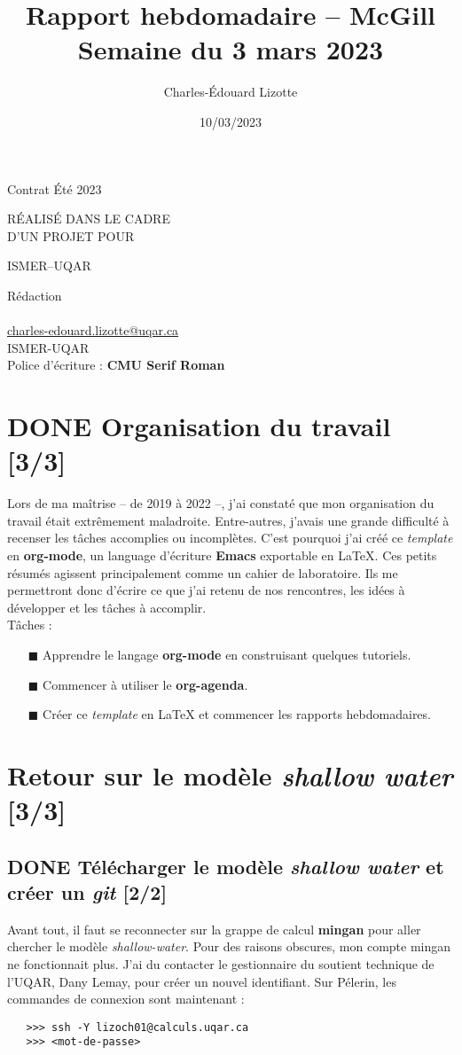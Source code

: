 \documentclass[10pt]{report}
\author{Charles-Édouard Lizotte}
\date{10/03/2023}
\title{Rapport hebdomadaire -- McGill\\\medskip
\large Semaine du 3 mars 2023}
\makeatletter
\numberwithin{equation}{section}
\renewcommand{\boxtimes}{\blacksquare}
\newcommand{\mytitlepage}{
\begin{titlepage}
\begin{center}
{\Huge Contrat Été 2023 \par}
\vspace{2cm}
{\Huge \MakeUppercase{\thetitle} \par}
\vspace{2cm}
RÉALISÉ DANS LE CADRE\\ D'UN PROJET POUR \par
\vspace{2cm}
{\Huge ISMER--UQAR \par}
\vspace{2cm}
{\thedate}
\end{center}
\vfill
Rédaction \\
{\theauthor}\\
\url{charles-edouard.lizotte@uqar.ca}\\
ISMER-UQAR\\
Police d'écriture : \textbf{CMU Serif Roman}
\end{titlepage}
}
\makeatother
\begin{document}
\mytitlepage
\tableofcontents\newpage


\section{{\bfseries\sffamily DONE} Organisation du travail [3/3]}
\label{sec:orgb8265ad}
Lors de ma maîtrise -- de 2019 à 2022 --, j'ai constaté que mon organisation du travail était extrêmement maladroite.
Entre-autres, j'avais une grande difficulté à recenser les tâches accomplies ou incomplètes. 
C'est pourquoi j'ai créé ce \emph{template} en \textbf{org-mode}, un language d'écriture \textbf{Emacs} exportable en \LaTeX{}.
Ces petits résumés agissent principalement comme un cahier de laboratoire. 
Ils me permettront donc d'écrire ce que j'ai retenu de nos rencontres, les idées à développer et les tâches à accomplir.\\[0pt]

Tâches : 
\begin{itemize}
\item[{$\boxtimes$}] Apprendre le langage \textbf{org-mode} en construisant quelques tutoriels.
\item[{$\boxtimes$}] Commencer à utiliser le \textbf{org-agenda}.
\item[{$\boxtimes$}] Créer ce \emph{template} en \LaTeX{} et commencer les rapports hebdomadaires.
\end{itemize}

\section{Retour sur le modèle \emph{shallow water} [3/3]}
\label{sec:orgca6d3f7}
\subsection{{\bfseries\sffamily DONE} Télécharger le modèle \emph{shallow water} et créer un \emph{git} [2/2]}
\label{sec:orgd55dc5b}
Avant tout, il faut se reconnecter sur la grappe de calcul \textbf{mingan} pour aller chercher le modèle \emph{shallow-water}. 
Pour des raisons obscures, mon compte mingan ne fonctionnait plus.
J'ai du contacter le gestionnaire du soutient technique de l'UQAR, Dany Lemay, pour créer un nouvel identifiant. 
Sur Pélerin, les commandes de connexion sont maintenant : 
\begin{verbatim}
   >>> ssh -Y lizoch01@calculs.uqar.ca
   >>> <mot-de-passe>
\end{verbatim}
\end{document}
